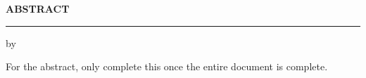 
\newpage
\begin{center}
  {\normalfont\LARGE\bfseries\Large ABSTRACT}
  \rule{\linewidth}{0.1mm}

  {\bfseries\MakeUppercase{\dtthetitleeng}}

  by

  {\bfseries\dtthecandidatename}
\end{center}


\vspace*{0.5cm}
{
For the abstract, only complete this once the entire document is complete.
}

\newpage








